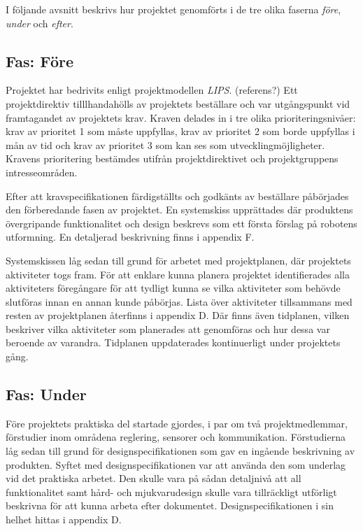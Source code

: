 \documentclass[11pt]{article}
\begin{document}
\begin{flushleft}
I följande avsnitt beskrivs hur projektet genomförts i de tre olika faserna \textit{före}, \textit{under} och \textit{efter}.

\subsection{Fas: Före}
Projektet har bedrivits enligt projektmodellen \textit{LIPS}. (referens?) Ett projektdirektiv tilllhandahölls av projektets beställare och var utgångspunkt vid framtagandet av projektets krav. Kraven delades in i tre olika prioriteringsnivåer: krav av prioritet 1 som måste uppfyllas, krav av prioritet 2 som borde uppfyllas i mån av tid och krav av prioritet 3 som kan ses som utvecklingmöjligheter. Kravens prioritering bestämdes utifrån projektdirektivet och projektgruppens intresseområden. 

Efter att kravspecifikationen färdigställts och godkänts av beställare påbörjades den förberedande fasen av projektet. En systemskiss upprättades där produktens övergripande funktionalitet och design beskrevs som ett första förslag på robotens utformning. En detaljerad beskrivning finns i appendix F. 

Systemskissen låg sedan till grund för arbetet med projektplanen, där projektets aktiviteter togs fram. För att enklare kunna planera projektet identifierades alla aktiviteters föregångare för att tydligt kunna se vilka aktiviteter som behövde slutföras innan en annan kunde påbörjas. Lista över aktiviteter tillsammans med resten av projektplanen återfinns i appendix D. Där finns även tidplanen, vilken beskriver vilka aktiviteter som planerades att genomföras och hur dessa var beroende av varandra. Tidplanen uppdaterades kontinuerligt under projektets gång.

\subsection{Fas: Under}
Före projektets praktiska del startade gjordes, i par om två projektmedlemmar, förstudier inom områdena reglering, sensorer och kommunikation. Förstudierna låg sedan till grund för designspecifikationen som gav en ingående beskrivning av produkten. Syftet med designspecifikationen var att använda den som underlag vid det praktiska arbetet. Den skulle vara på sådan detaljnivå att all funktionalitet samt hård- och mjukvarudesign skulle vara tillräckligt utförligt beskrivna för att kunna arbeta efter dokumentet. Designspecifikationen i sin helhet hittas i appendix D. 


\end{flushleft}
\end{document}
